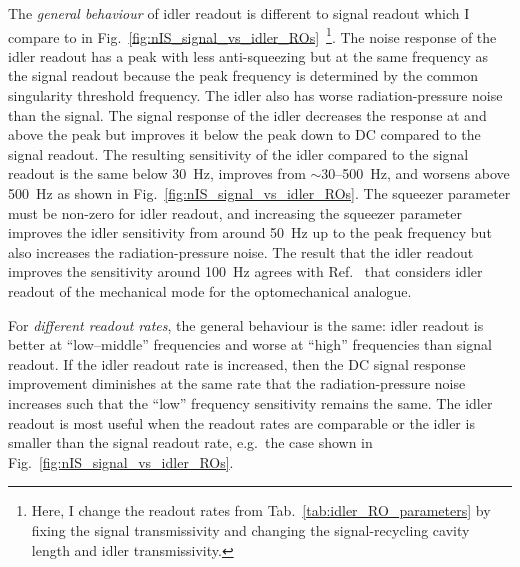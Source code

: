 The \emph{general behaviour} of idler readout is different to signal readout which I compare to in Fig.~\ref{fig:nIS_signal_vs_idler_ROs}~\footnote{Here, I change the readout rates from Tab.~\ref{tab:idler_RO_parameters} by fixing the signal transmissivity and changing the signal-recycling cavity length and idler transmissivity.}. The noise response of the idler readout has a peak with less anti-squeezing but at the same frequency as the signal readout because the peak frequency is determined by the common singularity threshold frequency. The idler also has worse radiation-pressure noise than the signal.
The signal response of the idler decreases the response at and above the peak but improves it below the peak down to DC compared to the signal readout. 
The resulting sensitivity of the idler compared to the signal readout is the same below 30~Hz, improves from $\sim$30--500~Hz, and worsens above 500~Hz as shown in Fig.~\ref{fig:nIS_signal_vs_idler_ROs}. The squeezer parameter must be non-zero for idler readout, and increasing the squeezer parameter improves the idler sensitivity from around 50~Hz up to the peak frequency but also increases the radiation-pressure noise. 
The result that the idler readout improves the sensitivity around 100~Hz agrees with Ref.~\cite{liEnhancingInterferometerSensitivity2021} that considers idler readout of the mechanical mode for the optomechanical analogue.

For \emph{different readout rates}, the general behaviour is the same: idler readout is better at ``low--middle'' frequencies and worse at ``high'' frequencies than signal readout. If the idler readout rate is increased, then the DC signal response improvement diminishes at the same rate that the radiation-pressure noise increases such that the ``low'' frequency sensitivity remains the same. The idler readout is most useful when the readout rates are comparable or the idler is smaller than the signal readout rate, e.g.\ the case shown in Fig.~\ref{fig:nIS_signal_vs_idler_ROs}.


